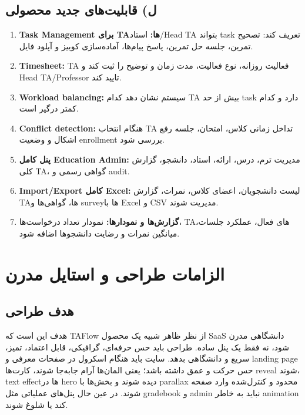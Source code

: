 \documentclass[12pt,a4paper]{article}
\begin{document}
\subsection{ل) قابلیت‌های جدید محصولی}
\begin{enumerate}[resume]
  \item \textbf{Task Management برای TAها:} استاد/Head TA بتواند task تعریف کند: تصحیح تمرین، جلسه حل تمرین، پاسخ پیام‌ها، آماده‌سازی کوییز و آپلود فایل.
  \item \textbf{Timesheet:} TA فعالیت روزانه، نوع فعالیت، مدت زمان و توضیح را ثبت کند و Head TA/Professor تایید کند.
  \item \textbf{Workload balancing:} سیستم نشان دهد کدام TA بیش از حد task دارد و کدام کمتر درگیر است.
  \item \textbf{Conflict detection:} هنگام انتخاب TA تداخل زمانی کلاس، امتحان، جلسه رفع اشکال و وضعیت enrollment بررسی شود.
  \item \textbf{پنل کامل Education Admin:} مدیریت ترم، درس، ارائه، استاد، دانشجو، گزارش کلی TA، گواهی رسمی و audit.
  \item \textbf{Import/Export کامل Excel:} لیست دانشجویان، اعضای کلاس، نمرات، گزارش TAها، گواهی‌ها و surveyها با Excel و CSV مدیریت شوند.
  \item \textbf{گزارش‌ها و نمودارها:} نمودار تعداد درخواست‌ها، TAهای فعال، عملکرد جلسات، میانگین نمرات و رضایت دانشجوها اضافه شود.
\end{enumerate}

\section{الزامات طراحی و استایل مدرن}
\subsection{هدف طراحی}
هدف این است که TAFlow از نظر ظاهر شبیه یک محصول SaaS دانشگاهی مدرن شود، نه فقط یک پنل ساده. طراحی باید حس حرفه‌ای، گرافیکی، قابل اعتماد، تمیز، سریع و دانشگاهی بدهد. سایت باید هنگام اسکرول در صفحات معرفی و landing page حس حرکت و عمق داشته باشد؛ یعنی المان‌ها آرام جابه‌جا شوند، کارت‌ها reveal شوند، text effectها در hero دیده شوند و بخش‌ها با parallax محدود و کنترل‌شده وارد صفحه شوند. در عین حال پنل‌های عملیاتی مثل gradebook و admin نباید به خاطر animation کند یا شلوغ شوند.
\end{document}
